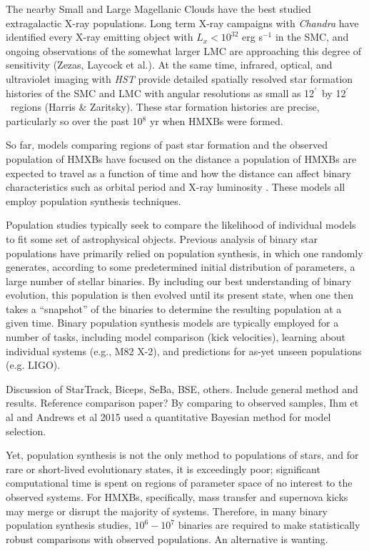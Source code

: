 \documentclass[usenatbib]{mnras}
\newcommand{\amin}{\ifmmode {^{\prime}\ }\else$^{\prime}$\fi}
\begin{document}
The nearby Small and Large Magellanic Clouds have the best studied extragalactic X-ray populations. Long term X-ray campaigns with {\it Chandra} have identified every X-ray emitting object with $L_x < 10^{32}$ erg s$^{-1}$ in the SMC, and ongoing observations of the somewhat larger LMC are approaching this degree of sensitivity (Zezas, Laycock et al.). At the same time, infrared, optical, and ultraviolet imaging with {\it HST} provide detailed spatially resolved star formation histories of the SMC and LMC with angular resolutions as small as 12\amin\ by 12\amin\ regions (Harris \& Zaritsky). These star formation histories are precise, particularly so over the past 10$^8$ yr when HMXBs were formed.


So far, models comparing regions of past star formation and the observed population of HMXBs have focused on the distance a population of HMXBs are expected to travel as a function of time \citep{sepinsky05} and how the distance can affect binary characteristics such as orbital period and X-ray luminosity \citep{zuo10, zuo15}. These models all employ population synthesis techniques.


Population studies typically seek to compare the likelihood of individual models to fit some set of astrophysical objects. Previous analysis of binary star populations have primarily relied on population synthesis, in which one randomly generates, according to some predetermined initial distribution of parameters, a large number of stellar binaries. By including our best understanding of binary evolution, this population is then evolved until its present state, when one then takes a ``snapshot'' of the binaries to determine the resulting population at a given time. Binary population synthesis models are typically employed for a number of tasks, including model comparison (kick velocities), learning about individual systems (e.g., M82 X-2), and predictions for as-yet unseen populations (e.g. LIGO). 


Discussion of StarTrack, Biceps, SeBa, BSE, others. Include general method and results. Reference comparison paper? By comparing to observed samples, Ihm et al and Andrews et al 2015 used a quantitative Bayesian method for model selection.


Yet, population synthesis is not the only method to populations of stars, and for rare or short-lived evolutionary states, it is exceedingly poor; significant computational time is spent on regions of parameter space of no interest to the observed systems. For HMXBs, specifically, mass transfer and supernova kicks may merge or disrupt the majority of systems. Therefore, in many binary population synthesis studies, $10^6-10^7$ binaries are required to make statistically robust comparisons with observed populations. An alternative is wanting.
\end{document}
